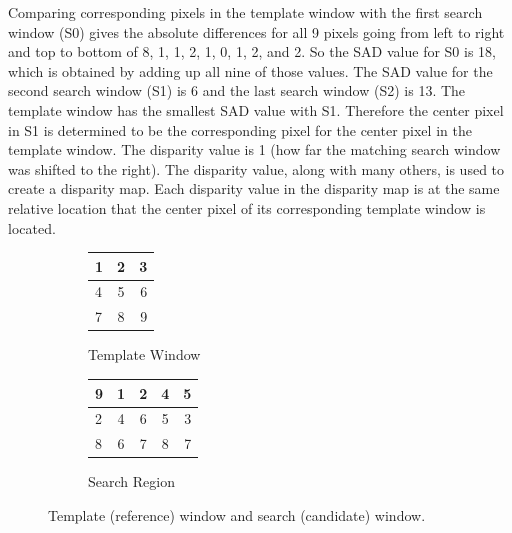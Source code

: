 Comparing corresponding pixels in the template window with the first search window (S0) gives the absolute differences for all 9 pixels going from left to right and top to bottom of 8, 1, 1, 2, 1, 0, 1, 2, and 2. So the SAD value for S0 is 18, which is obtained by adding up all nine of those values. The SAD value for the second search window (S1) is 6 and the last search window (S2) is 13. The template window has the smallest SAD value with S1. Therefore the center pixel in S1 is determined to be the corresponding pixel for the center pixel in the template window. The disparity value is 1 (how far the matching search window was shifted to the right). The disparity value, along with many others, is used to create a disparity map. Each disparity value in the disparity map is at the same relative location that the center pixel of its corresponding template window is located.

\begin{figure}[h]
\begin{center}
	\begin{subfigure}{0.3\textwidth}
		\begin{center}				
			\begin{tabular}{|l|c|r|}
				\hline
				1 & 2 & 3 \\\hline
	  			4 & 5 & 6 \\\hline
		    	7 & 8 & 9 \\
		    	\hline
			\end{tabular}
		\end{center}
		\caption{Template Window}
		\label{fig:template}
	\end{subfigure}
	\begin{subfigure}{0.3\textwidth}
		\begin{center}		
			\begin{tabular}{|l|c|c|c|r|}
				\hline
				9 & 1 & 2 & 4 & 5 \\\hline
		  		2 & 4 & 6 & 5 & 3 \\\hline
		    	8 & 6 & 7 & 8 & 7 \\
		    	\hline
			\end{tabular}
		\end{center}
		\caption{Search Region}
		\label{fig:search}
	\end{subfigure}
	\captionfonts
	\caption{Template (reference) window and search (candidate) window.}
	\label{fig:windows}
\end{center}
\end{figure}
